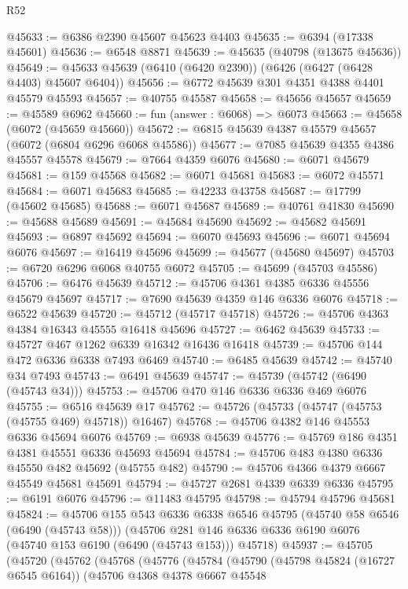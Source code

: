 \begin{lexlean}{R52}
\begin{coremodule}
@45633 := @6386 @2390 @45607 @45623 @4403
@45635 := @6394 (@17338 @45601)
@45636 := @6548 @8871
@45639 := @45635 (@40798 (@13675 @45636))
@45649 := @45633 @45639 (@6410 (@6420 @2390)) (@6426 (@6427 (@6428 @4403) @45607 @6404))
@45656 := @6772 @45639 @301 @4351 @4388 @4401 @45579 @45593
@45657 := @40755 @45587
@45658 := @45656 @45657
@45659 := @45589 @6962
@45660 := fun (answer : @6068) => @6073
@45663 := @45658 (@6072 (@45659 @45660))
@45672 := @6815 @45639 @4387 @45579 @45657 (@6072 (@6804 @6296 @6068 @45586))
@45677 := @7085 @45639 @4355 @4386 @45557 @45578
@45679 := @7664 @4359 @6076
@45680 := @6071 @45679
@45681 := @159 @45568
@45682 := @6071 @45681
@45683 := @6072 @45571
@45684 := @6071 @45683
@45685 := @42233 @43758
@45687 := @17799 (@45602 @45685)
@45688 := @6071 @45687
@45689 := @40761 @41830
@45690 := @45688 @45689
@45691 := @45684 @45690
@45692 := @45682 @45691
@45693 := @6897 @45692
@45694 := @6070 @45693
@45696 := @6071 @45694 @6076
@45697 := @16419 @45696
@45699 := @45677 (@45680 @45697)
@45703 := @6720 @6296 @6068 @40755 @6072
@45705 := @45699 (@45703 @45586)
@45706 := @6476 @45639
@45712 := @45706 @4361 @4385 @6336 @45556 @45679 @45697
@45717 := @7690 @45639 @4359 @146 @6336 @6076
@45718 := @6522 @45639
@45720 := @45712 (@45717 @45718)
@45726 := @45706 @4363 @4384 @16343 @45555 @16418 @45696
@45727 := @6462 @45639
@45733 := @45727 @467 @1262 @6339 @16342 @16436 @16418
@45739 := @45706 @144 @472 @6336 @6338 @7493 @6469
@45740 := @6485 @45639
@45742 := @45740 @34 @7493
@45743 := @6491 @45639
@45747 := @45739 (@45742 (@6490 (@45743 @34)))
@45753 := @45706 @470 @146 @6336 @6336 @469 @6076
@45755 := @6516 @45639 @17
@45762 := @45726 (@45733 (@45747 (@45753 (@45755 @469) @45718)) @16467)
@45768 := @45706 @4382 @146 @45553 @6336 @45694 @6076
@45769 := @6938 @45639
@45776 := @45769 @186 @4351 @4381 @45551 @6336 @45693 @45694
@45784 := @45706 @483 @4380 @6336 @45550 @482 @45692 (@45755 @482)
@45790 := @45706 @4366 @4379 @6667 @45549 @45681 @45691
@45794 := @45727 @2681 @4339 @6339 @6336
@45795 := @6191 @6076
@45796 := @11483 @45795
@45798 := @45794 @45796 @45681
@45824 := @45706
    @155
    @543
    @6336
    @6338
    @6546
    @45795
    (@45740 @58 @6546 (@6490 (@45743 @58)))
    (@45706 @281 @146 @6336 @6336 @6190 @6076 (@45740 @153 @6190 (@6490 (@45743 @153))) @45718)
@45937 := @45705
    (@45720
      (@45762
        (@45768
          (@45776
            (@45784
              (@45790
                (@45798 @45824 (@16727 @6545 @6164))
                (@45706
                  @4368
                  @4378
                  @6667
                  @45548

\end{coremodule}
\end{lexlean}
